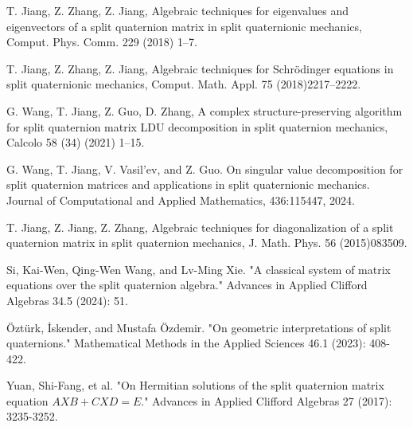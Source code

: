 \documentclass[12pt]{article}
\numberwithin{equation}{section} %
\begin{document}
\begin{thebibliography}{99}
T. Jiang, Z. Zhang, Z. Jiang, Algebraic techniques for eigenvalues and eigenvectors of a split quaternion matrix in split quaternionic mechanics,
Comput. Phys. Comm. 229 (2018) 1–7.

T. Jiang, Z. Zhang, Z. Jiang, Algebraic techniques for Schrödinger equations in split quaternionic mechanics, Comput. Math. Appl. 75 (2018)2217–2222.

G. Wang, T. Jiang, Z. Guo, D. Zhang, A complex structure-preserving algorithm for split quaternion matrix LDU decomposition in split quaternion
mechanics, Calcolo 58 (34) (2021) 1–15.

G. Wang, T. Jiang, V. Vasil’ev, and Z. Guo. On singular value decomposition
for split quaternion matrices and applications in split quaternionic mechanics. Journal of
Computational and Applied Mathematics, 436:115447, 2024.

 T. Jiang, Z. Jiang, Z. Zhang, Algebraic techniques for diagonalization of a split quaternion matrix in split quaternion mechanics, J. Math. Phys. 56 (2015)083509.

Si, Kai-Wen, Qing-Wen Wang, and Lv-Ming Xie. "A classical system of matrix equations over the split quaternion algebra." Advances in Applied Clifford Algebras 34.5 (2024): 51.

Öztürk, İskender, and Mustafa Özdemir. "On geometric interpretations of split quaternions." Mathematical Methods in the Applied Sciences 46.1 (2023): 408-422.

Yuan, Shi-Fang, et al. "On Hermitian solutions of the split quaternion matrix equation $AXB+CXD=E$." Advances in Applied Clifford Algebras 27 (2017): 3235-3252.
\end{thebibliography}
\end{document}
